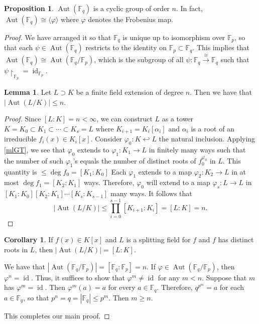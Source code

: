 \documentclass[10pt,letterpaper,cm]{nupset}
\theoremstyle{definition}
\theoremstyle{theorem}
\newtheorem{lemma}[definition]{Lemma}
\newtheorem{prop}[definition]{Proposition}
\newtheorem{corollary}[definition]{Corollary}
\theoremstyle{remark}
\newcommand{\F}{\mathbb F}
\newcommand{\1}{\mathbf{1}}
\newcommand{\0}{\vec 0}
\DeclareMathOperator{\id}{id}
\DeclareMathOperator{\aut}{Aut}
\begin{document}
\begin{prop} 
 $\aut(\F_q)$ is a cyclic group of order $n$. In fact, $\aut(\F_q) \cong \langle \varphi \rangle$ where $\varphi$ denotes the Frobenius map.
 \end{prop}
\begin{proof}
We have arranged it so that $\F_q$ is unique up to isomorphism over $\F_p$, so that each $\psi \in \aut(\F_q)$ restricts to the identity on $\F_p \subset \F_q$. This implies that $\aut(\F_q) \cong \aut(\F_q/\F_p)$, which is the subgroup of all $\psi : \F_q \overset{\cong}{\longrightarrow} \F_q$ such that $\psi \restriction_{\F_p} = \id_{\F_p}$.
\begin{lemma}
Let $L \supset K$ be a finite field extension of degree $n$. Then we have that $\left\lvert{\aut(L/K)}\right\rvert \leq n$.
\end{lemma}
\begin{proof}
Since $[L:K] = n < \infty$, we can construct $L$ as a tower $K= K_0 \subset K_1 \subset \cdots \subset K_s =L$ where $K_{i+1} = K_i[\alpha_i]$ and $\alpha_i$ is a root of an irreducible $f_i(x) \in K_i[x]$. Consider $\varphi_0 : K \hookleftarrow L$ the natural inclusion. Applying \cref{mlGT}, we see that $\varphi_0$ extends to $\varphi_1 : K_1 \to L$ in finitely many ways such that the number of such $\varphi_1$'s equals the number of distinct roots of $f_0^{\varphi_0}$ in $L$. This quantity is $\leq \deg{f_0} = [K_1 : K_0]$ Each $\varphi_1$ extends to a map $\varphi_2 : K_2 \to L$ in at most $\deg{f_1}= [K_2 : K_1]$ ways. Therefore, $\varphi_0$ will extend to a map $\varphi_s : L \to L$ in $\left[K_1 : K_0\right]\left[K_2 : K_1\right] \cdots \left[K_s : K_{s-1}\right]$ many ways. It follows that $$\left\lvert{\aut(L/K)}\right\rvert \leq \prod_{i=0}^{s-1} [K_{i+1} : K_i] = [L:K] =n.$$ 
\end{proof}

\begin{corollary}
If $f(x) \in K[x]$ and $L$ is a splitting field for $f$ and $f$ has distinct roots in $L$, then $\left\lvert{\aut(L/K)}\right\rvert = \left[L:K\right]$.
\end{corollary}
We have that $\left\lvert{\aut(\F_q/\F_p)}\right\rvert = \left[\F_q : \F_p\right] =n$. 
If $\varphi \in \aut(\F_q/\F_p)$, then $\varphi^n = \id$. Thus, it suffices to show that $\varphi^m \ne \id$ for any $m <n$. Suppose that $m$ has $\varphi^m = \id$. Then $\varphi^m(a) = a$ for every $a\in \F_q$. Therefore, $q^{p^m} = a$ for each $a\in \F_q$, so that $p^n = q = \left\lvert{\F_q}\right\rvert \leq p^m$. Then $m \geq n$.

\medskip

 This completes our main proof.
\end{proof}
\end{document}
